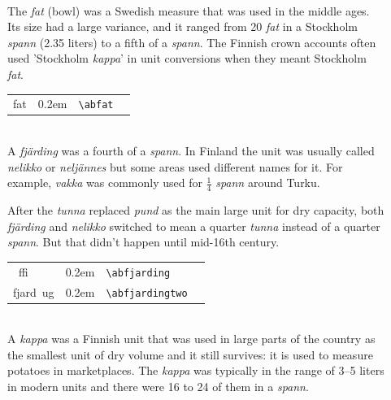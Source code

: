 \documentclass[a4paper]{article}
\newcommand{\samplefont}{\fontsize{16}{16}\abcursivefamily\spaceskip0.2em}
\newcommand{\sample}[1]{{\samplefont #1 \strut}}
\newcommand{\ltxncmd}[1]{\texttt{\textbackslash{}#1}}
\begin{document}
\begin{description}









\item [\sample{fat} \emph{fat}] \mbox{} \\
  The \emph{fat} (bowl) was a Swedish measure that was used in the
  middle ages. Its size had a large variance, and it ranged from 20
  \emph{fat} in a Stockholm \emph{spann} (2.35 liters) to a fifth of a
  \emph{spann}. The Finnish crown accounts often used 'Stockholm
  \emph{kappa}' in unit conversions when they meant Stockholm
  \emph{fat}.
  \begin{center}
    \begin{tabular}{llll}
      {}fat  & \sample{\abfat} & \ltxncmd{abfat} \\
    \end{tabular}
  \end{center}

\item [\sample{\abfjarding}, \sample{\abfjardingtwo} \emph{fjärding},
  \emph{nelikko}, \emph{neljännes}, \emph{quartale modii}] \mbox{} \\
  A \emph{fjärding} was a fourth of a \emph{spann}. In Finland the
  unit was usually called \emph{nelikko} or \emph{neljännes} but some
  areas used different names for it. For example, \emph{vakka} was
  commonly used for $\frac{1}{4}$ \emph{spann} around Turku. 

  After the \emph{tunna} replaced \emph{pund} as the main large unit
  for dry capacity, both \emph{fjärding} and \emph{nelikko} switched
  to mean a quarter \emph{tunna} instead of a quarter \emph{spann}.
  But that didn't happen until mid-16th century.
  \begin{center}
    \begin{tabular}{llll}
      {}~ffi  & \sample{\abfjarding} & \ltxncmd{abfjarding} \\
      {}fjard~ug & \sample{\abfjardingtwo} & \ltxncmd{abfjardingtwo}    \\
    \end{tabular}
  \end{center}


\item [\sample{\abkappa}, \sample{\abkappatwo}, \emph{kappe}, \emph{kappa}] \mbox{} \\
  A \emph{kappa} was a Finnish unit that was used in large parts of
  the country as the smallest unit of dry volume and it still
  survives: it is used to measure potatoes in marketplaces. The
  \emph{kappa} was typically in the range of 3–5 liters in modern
  units and there were 16 to 24 of them in a \emph{spann}.


\end{description}
\end{document}
